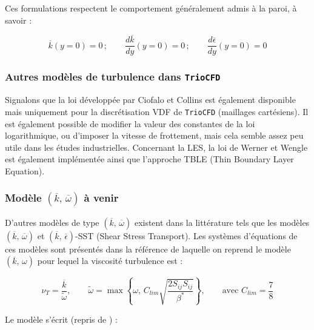 Ces formulations respectent le comportement g\'en\'eralement admis \`a la
paroi, \`a savoir :

\[
\overline{k}(y=0)=0\,;\qquad\frac{d\overline{k}}{dy}(y=0)=0\,;\qquad\frac{d\overline{\epsilon}}{dy}(y=0)=0
\]



\subsubsection{Autres mod\`eles de turbulence dans \texttt{TrioCFD}}

Signalons que la loi d\'evelopp\'ee par Ciofalo et Collins \cite{Ciofalo-Collins_NHTB1989}
est \'egalement disponible mais uniquement pour la discr\'etisation VDF
de \texttt{TrioCFD} (maillages cart\'esiens). Il est \'egalement possible
de modifier la valeur des constantes de la loi logarithmique, ou d\textquoteright imposer
la vitesse de frottement, mais cela semble assez peu utile dans les
\'etudes industrielles. Concernant la LES, la loi de Werner et Wengle
est \'egalement impl\'ement\'ee \cite{Werner-Wengle_Proc1991} ainsi que
l\textquoteright approche TBLE (Thin Boundary Layer Equation).


\subsubsection*{Mod\`ele $(\overline{k},\,\overline{\omega})$ \`a venir}

D'autres mod\`eles de type $(\overline{k},\,\overline{\omega})$ existent
dans la litt\'erature tels que les mod\`eles $(\overline{k},\,\overline{\omega})$
et $(\overline{k},\,\overline{\epsilon})$-SST (Shear Stress Transport).
Les syst\`emes d'\'equations de ces mod\`eles sont pr\'esent\'es dans la r\'ef\'erence
\cite[sec 2.3.6 pp. 701--705]{Argyropoulos-Markatos_ReviewTurbulence_AMM2015}
de laquelle on reprend le mod\`ele $(\overline{k},\,\omega)$ pour lequel
la viscosit\'e turbulence est :

\[
\nu_{T}=\frac{\overline{k}}{\tilde{\omega}},\qquad\tilde{\omega}=\max\left\{ \omega,\,C_{lim}\sqrt{\frac{2S_{ij}S_{ij}}{\beta^{*}}}\right\} ,\qquad\mbox{avec }C_{lim}=\frac{7}{8}
\]


Le mod\`ele s'\'ecrit \cite[p. 702]{Argyropoulos-Markatos_ReviewTurbulence_AMM2015}
(repris de \cite{Wilcox_AIAA1988}) :

